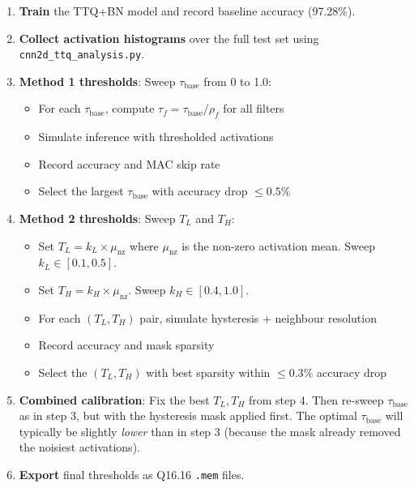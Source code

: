 \documentclass[11pt,a4paper]{article}
\begin{document}
\begin{enumerate}
    \item \textbf{Train} the TTQ+BN model and record baseline accuracy (97.28\%).

    \item \textbf{Collect activation histograms} over the full test set using
        \texttt{cnn2d\_ttq\_analysis.py}.

    \item \textbf{Method 1 thresholds}: Sweep $\tau_{\text{base}}$ from 0 to 1.0:
    \begin{itemize}[nosep]
        \item For each $\tau_{\text{base}}$, compute $\tau_f = \tau_{\text{base}} / \rho_f$
            for all filters
        \item Simulate inference with thresholded activations
        \item Record accuracy and MAC skip rate
        \item Select the largest $\tau_{\text{base}}$ with accuracy drop $\leq 0.5\%$
    \end{itemize}

    \item \textbf{Method 2 thresholds}: Sweep $T_L$ and $T_H$:
    \begin{itemize}[nosep]
        \item Set $T_L = k_L \times \mu_{\text{nz}}$ where $\mu_{\text{nz}}$ is the
            non-zero activation mean. Sweep $k_L \in [0.1, 0.5]$.
        \item Set $T_H = k_H \times \mu_{\text{nz}}$. Sweep $k_H \in [0.4, 1.0]$.
        \item For each $(T_L, T_H)$ pair, simulate hysteresis + neighbour resolution
        \item Record accuracy and mask sparsity
        \item Select the $(T_L, T_H)$ with best sparsity within $\leq 0.3\%$ accuracy drop
    \end{itemize}

    \item \textbf{Combined calibration}: Fix the best $T_L, T_H$ from step 4.
        Then re-sweep $\tau_{\text{base}}$ as in step 3, but with the hysteresis mask
        applied first.  The optimal $\tau_{\text{base}}$ will typically be slightly
        \emph{lower} than in step 3 (because the mask already removed the noisiest
        activations).

    \item \textbf{Export} final thresholds as Q16.16 \texttt{.mem} files.
\end{enumerate}
\end{document}

